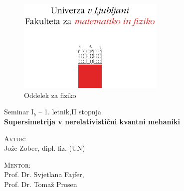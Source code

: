 \begin{titlepage}
	\begin{figure}[H]
		\centering
		\includegraphics[width = 7cm, keepaspectratio=1]{pics/logo.pdf}\\[12pt]
		{\sc Oddelek za fiziko}\\[4cm]
	\end{figure}
	\begin{center}
		\large{Seminar I$_b$ -- 1. letnik,II stopnja}\\[0.5cm]
		\LARGE\textbf{Supersimetrija v nerelativisti\v cni kvantni mehaniki}\\[1.0cm]

		\vspace{0.0cm}

		\begin{minipage}{0.4\textwidth}\small
			\begin{flushleft}
			\textsc{Avtor:}\\[0.2cm]
			Jo\v ze Zobec, dipl. fiz. (UN)
			\end{flushleft}
		\end{minipage}
		\begin{minipage}{0.4\textwidth}\small
			\begin{flushright}
				\textsc{Mentor:}\\[0.2cm]
				Prof. Dr. Svjetlana Fajfer,\\[0.1cm]
				Prof. Dr. Toma\v z Prosen
			\end{flushright}
		\end{minipage}
	\end{center}

	\vspace{3.5cm}

	\begin{abstract}
		Supersimetrija je \v sir\v se podro\v cje, ki ni omejeno zgolj na fiziko osnovnih
		delcev, pa\v c pa lahko najde rabo tudi drugod v fiziki. V tem seminarju bom pokazal
		ra\v cunske prijeme v obravnavi \v solskih kvantno-mehanskih problemov s pomo\v cjo
		supersimetri\v cnega ogrodja in novosti v teoriji izospektralnih Hamiltonianov ter
		teoriji perturbacij.
	\end{abstract}
	
	\vfill

\end{titlepage}

